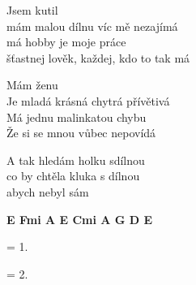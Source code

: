 
\ve{}
Jsem kutil\\
mám malou dílnu víc mě nezajímá\\
má hobby je moje práce\\
šťastnej lověk, každej, kdo to tak má

\ve{}
Mám ženu\\
Je mladá krásná chytrá přívětivá\\
Má jednu malinkatou chybu\\
Že si se mnou vůbec nepovídá

\cho{}
A tak hledám holku sdílnou\\
co by chtěla kluka s dílnou\\
abych nebyl sám 

\re{}
{\footnotesize\textbf{E F\guitarSharp{}mi A E C\guitarSharp{}mi A G D E}}

\ve{} = 1.

\ve{} = 2.

\cho{}

\esong{}